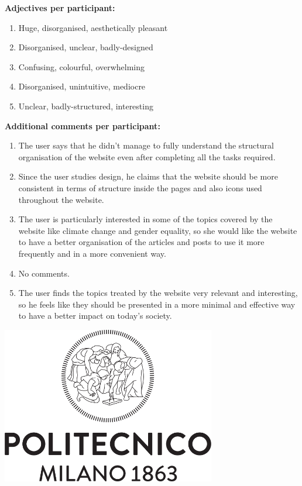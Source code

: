 \textbf{Adjectives per participant:}
\begin{enumerate}
	\item Huge, disorganised, aesthetically pleasant
	\item Disorganised, unclear, badly-designed
	\item Confusing, colourful, overwhelming
	\item Disorganised, unintuitive, mediocre
	\item Unclear, badly-structured, interesting
\end{enumerate}

\vspace{0.25cm}

\textbf{Additional comments per participant:}
\begin{enumerate}
	\item The user says that he didn't manage to fully understand the structural organisation of the website even after completing all the tasks required.
	\item Since the user studies design, he claims that the website should be more consistent in terms of structure inside the pages and also icons used throughout the website.
	\item The user is particularly interested in some of the topics covered by the website like climate change and gender equality, so she would like the website to have a better organisation of the articles and posts to use it more frequently and in a more convenient way.
	\item No comments.
	\item The user finds the topics treated by the website very relevant and interesting, so he feels like they should be presented in a more minimal and effective way to have a better impact on today's society.
\end{enumerate}



\clearpage

\centering

\vspace{4cm}

\includegraphics[width=0.7\textwidth]{res/Logo_poli}
